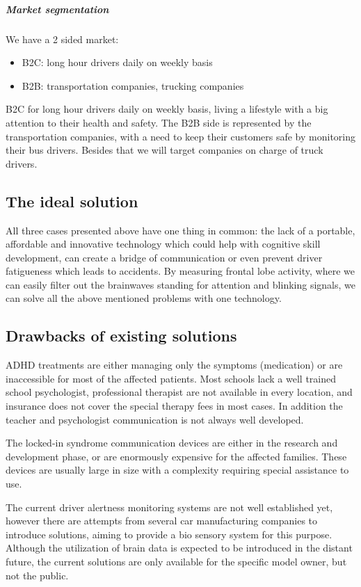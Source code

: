 \documentclass[letterpaper,10pt]{article}
\let\oldsubsection\subsection
\renewcommand{\subsection}{\def\cursectioning{subsection}\oldsubsection}
\begin{document}
\subparagraph{Market segmentation}
We have a 2 sided market:
\begin{itemize}
\item B2C: long hour drivers daily on weekly basis 
\item B2B: transportation companies, trucking companies
\end{itemize}  

B2C for long hour drivers daily on weekly basis, living a lifestyle with a big attention to their health and safety. The B2B side is represented by the transportation companies, with a need to keep their customers safe by monitoring their bus drivers. Besides that we will target companies on charge of truck drivers.

\subsection{The ideal solution} 

All three cases presented above have one thing in common: the lack of a portable, affordable and innovative technology which could help with cognitive skill development, can create a bridge of communication or even prevent driver fatigueness which leads to accidents. By measuring frontal lobe activity, where we can easily filter out the brainwaves standing for attention and blinking signals, we can solve all the above mentioned problems with one technology.

\subsection{Drawbacks of existing solutions}

ADHD treatments are either managing only the symptoms (medication) or are inaccessible for most of the affected patients. Most schools lack a well trained school psychologist, professional therapist are not available in every location, and insurance does not cover the special therapy fees in most cases. In addition the teacher and psychologist communication is not always well developed.

The locked-in syndrome communication devices are either in the research and development phase, or are enormously expensive for the affected families. These devices are usually large in size with a complexity requiring special assistance to use.   

The current driver alertness monitoring systems are not well established yet, however there are attempts from several car manufacturing companies to introduce solutions, aiming to provide a bio sensory system for this purpose. Although the utilization of brain data is expected to be introduced in the distant future,  the current solutions are only available for the specific model owner, but not the public.
\end{document}
